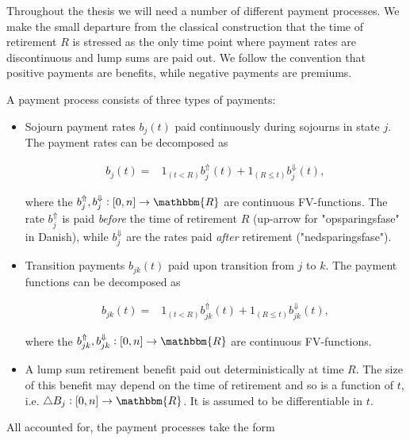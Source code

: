 \documentclass{book}
\newcommand{\1}[1]{\mathbbm{1}_{\left\lbrace #1 \right\rbrace}}
\theoremstyle{break}
\theoremstyle{remark}
\numberwithin{equation}{section}
\begin{document}
Throughout the thesis we will need a number of different payment processes. We make the small departure from the classical construction that the time of retirement $R$ is stressed as the only time point where payment rates are discontinuous and lump sums are paid out. We follow the convention that positive payments are benefits, while negative payments are premiums.

A payment process consists of three types of payments:

\begin{itemize}
    \item Sojourn payment rates $b_j(t)$ paid continuously during sojourns in state $j$. The payment rates can be decomposed as
    
    \begin{align*}
        b_j(t) =& 1_{\left( t<R \right)} b_j^{\Uparrow}(t) + 1_{\left( R \leq t \right)} b_j^{\Downarrow}(t),
    \end{align*}
    
    where the $b_j^{\Uparrow}, b_j^{\Downarrow}: [0,n] \to \mathbbm{R}$ are continuous FV-functions. The rate $b_j^{\Uparrow}$ is paid \textit{before} the time of retirement $R$ (up-arrow for "opsparingsfase" in Danish), while $b_j^{\Downarrow}$ are the rates paid \textit{after} retirement ("nedsparingsfase").
    
    
    
    \item Transition payments $b_{jk}(t)$ paid upon transition from $j$ to $k$. The payment functions can be decomposed as
    
    \begin{align*}
        b_{jk}(t) =& 1_{\left( t<R \right)} b_{jk}^{\Uparrow}(t) + 1_{\left( R \leq t \right)} b_{jk}^{\Downarrow}(t),
    \end{align*}
    
    where the $b_{jk}^{\Uparrow}, b_{jk}^{\Downarrow}: [0,n] \to \mathbbm{R}$ are continuous FV-functions.
    
    
    
    \item A lump sum retirement benefit paid out deterministically at time $R$. The size of this benefit may depend on the time of retirement and so is a function of $t$, i.e. $\triangle B_j: [0,n] \to \mathbbm{R}$. It is assumed to be differentiable in $t$.
\end{itemize}

All accounted for, the payment processes take the form
\end{document}
